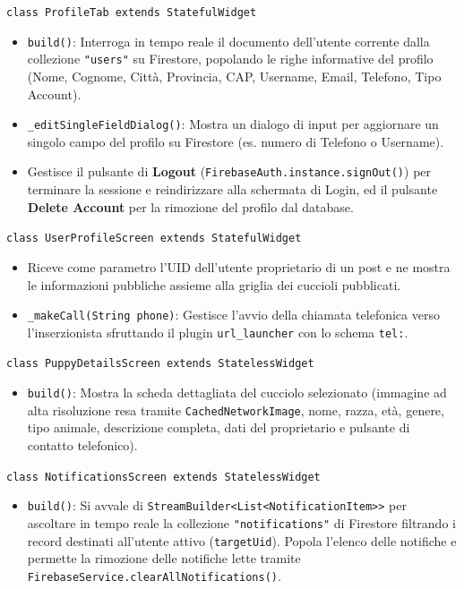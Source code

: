 \documentclass[a4paper]{report}
\begin{document}
\texttt{class ProfileTab extends StatefulWidget}
\begin{itemize}
    \item \texttt{build()}: Interroga in tempo reale il documento dell'utente corrente dalla collezione \texttt{"users"} su Firestore, popolando le righe informative del profilo (Nome, Cognome, Città, Provincia, CAP, Username, Email, Telefono, Tipo Account).
    \item \texttt{\_editSingleFieldDialog()}: Mostra un dialogo di input per aggiornare un singolo campo del profilo su Firestore (es. numero di Telefono o Username).
    \item Gestisce il pulsante di \textbf{Logout} (\texttt{FirebaseAuth.instance.signOut()}) per terminare la sessione e reindirizzare alla schermata di Login, ed il pulsante \textbf{Delete Account} per la rimozione del profilo dal database.
\end{itemize}

\texttt{class UserProfileScreen extends StatefulWidget}
\begin{itemize}
    \item Riceve come parametro l'UID dell'utente proprietario di un post e ne mostra le informazioni pubbliche assieme alla griglia dei cuccioli pubblicati.
    \item \texttt{\_makeCall(String phone)}: Gestisce l'avvio della chiamata telefonica verso l'inserzionista sfruttando il plugin \texttt{url\_launcher} con lo schema \texttt{tel:}.
\end{itemize}

\texttt{class PuppyDetailsScreen extends StatelessWidget}
\begin{itemize}
    \item \texttt{build()}: Mostra la scheda dettagliata del cucciolo selezionato (immagine ad alta risoluzione resa tramite \texttt{CachedNetworkImage}, nome, razza, età, genere, tipo animale, descrizione completa, dati del proprietario e pulsante di contatto telefonico).
\end{itemize}

\texttt{class NotificationsScreen extends StatelessWidget}
\begin{itemize}
    \item \texttt{build()}: Si avvale di \texttt{StreamBuilder<List<NotificationItem>>} per ascoltare in tempo reale la collezione \texttt{"notifications"} di Firestore filtrando i record destinati all'utente attivo (\texttt{targetUid}). Popola l'elenco delle notifiche e permette la rimozione delle notifiche lette tramite \texttt{FirebaseService.clearAllNotifications()}.
\end{itemize}
\end{document}
